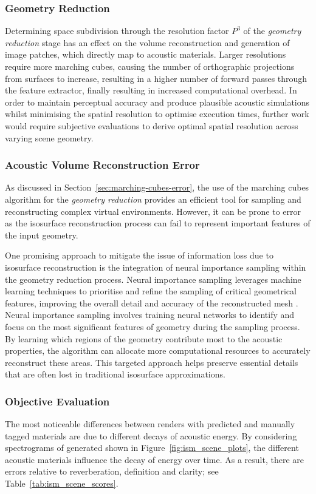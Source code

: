 \subsubsection{Geometry Reduction}
Determining space subdivision through the resolution factor $P^3$ of the \emph{geometry reduction} stage has an effect on the volume reconstruction and generation of image patches, which directly map to acoustic materials. Larger resolutions require more marching cubes, causing the number of orthographic projections from surfaces to increase, resulting in a higher number of forward passes through the feature extractor, finally resulting in increased computational overhead. In order to maintain perceptual accuracy and produce plausible acoustic simulations whilst minimising the spatial resolution to optimise execution times, further work would require subjective evaluations to derive optimal spatial resolution across varying scene geometry.\par

\subsubsection{Acoustic Volume Reconstruction Error}
As discussed in Section~\ref{sec:marching-cubes-error}, the use of the marching cubes algorithm for the \emph{geometry reduction} provides an efficient tool for sampling and reconstructing complex virtual environments. However, it can be prone to error as the isosurface reconstruction process can fail to represent important features of the input geometry.\par
One promising approach to mitigate the issue of information loss due to isosurface reconstruction is the integration of neural importance sampling within the geometry reduction process. Neural importance sampling leverages machine learning techniques to prioritise and refine the sampling of critical geometrical features, improving the overall detail and accuracy of the reconstructed mesh \citep{muller2019neural}. Neural importance sampling involves training neural networks to identify and focus on the most significant features of geometry during the sampling process. By learning which regions of the geometry contribute most to the acoustic properties, the algorithm can allocate more computational resources to accurately reconstruct these areas. This targeted approach helps preserve essential details that are often lost in traditional isosurface approximations.

\subsubsection{Objective Evaluation}
The most noticeable differences between renders with predicted and manually tagged materials are due to different decays of acoustic energy. By considering spectrograms of generated  shown in Figure~\ref{fig:ism_scene_plots}, the different acoustic materials influence the decay of energy over time. As a result, there are errors relative to reverberation, definition and clarity; see Table~\ref{tab:ism_scene_scores}.\par

